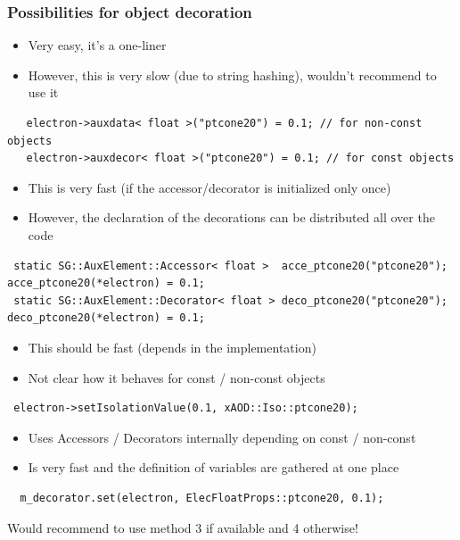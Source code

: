 \documentclass{beamer}
\begin{document}
\begin{frame}[fragile]
\frametitle{Possibilities for object decoration}
\begin{itemize}
 \item Very easy, it's a one-liner
 \item However, this is very slow (due to string hashing), wouldn't recommend to use it
\end{itemize}
\vspace{-4mm}
{\tiny
\begin{verbatim}
   electron->auxdata< float >("ptcone20") = 0.1; // for non-const objects
   electron->auxdecor< float >("ptcone20") = 0.1; // for const objects
\end{verbatim}
}
\vspace{-3mm}
\begin{itemize}
 \item This is very fast (if the accessor/decorator is initialized only once)
 \item However, the declaration of the decorations can be distributed all over the code
\end{itemize}
\vspace{-4mm}
{\tiny
\begin{verbatim}
 static SG::AuxElement::Accessor< float >  acce_ptcone20("ptcone20"); acce_ptcone20(*electron) = 0.1;
 static SG::AuxElement::Decorator< float > deco_ptcone20("ptcone20"); deco_ptcone20(*electron) = 0.1;
\end{verbatim}
}
\vspace{-3mm}
\begin{itemize}
 \item This should be fast (depends in the implementation)
 \item Not clear how it behaves for const / non-const objects
\end{itemize}
\vspace{-4mm}
{\tiny
\begin{verbatim}
 electron->setIsolationValue(0.1, xAOD::Iso::ptcone20);
\end{verbatim}
}
\vspace{-3mm}
\begin{itemize}
 \item Uses Accessors / Decorators internally depending on const / non-const
 \item Is very fast and the definition of variables are gathered at one place
\end{itemize}
\vspace{-4mm}
{\tiny
\begin{verbatim}
  m_decorator.set(electron, ElecFloatProps::ptcone20, 0.1);
\end{verbatim}
}
Would recommend to use method 3 if available and 4 otherwise!
\end{frame}
\end{document}
